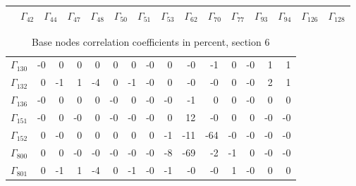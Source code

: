 {\begin{table}
\begin{center}
\begin{minipage}{\linewidth}
\begin{center}
\begin{envsmall}
\begin{center}
\begin{tabular}{rrrrrrrrrrrrrrr}
 & \( \Gamma_{42} \) & \( \Gamma_{44} \) & \( \Gamma_{47} \) & \( \Gamma_{48} \) & \( \Gamma_{50} \) & \( \Gamma_{51} \) & \( \Gamma_{53} \) & \( \Gamma_{62} \) & \( \Gamma_{70} \) & \( \Gamma_{77} \) & \( \Gamma_{93} \) & \( \Gamma_{94} \) & \( \Gamma_{126} \) & \( \Gamma_{128} \)
\\\hline
\end{tabular}
\end{center}
\end{envsmall}
\ifhevea\else
\end{center}
\end{minipage}
\fi
\end{center}
\ifhevea\end{table}\fi
\ifhevea\begin{table}\fi%
\begin{center}
\ifhevea
\caption{Base nodes correlation coefficients in percent, section 6\label{tab:tau:br-fit-corr6}}%
\else
\begin{minipage}{\linewidth}
\begin{center}
\label{tab:tau:br-fit-corr6}%
\fi
\begin{envsmall}
\begin{center}
\renewcommand*{\arraystretch}{1.1}%
\begin{tabular}{rrrrrrrrrrrrrrr}
\hline
\( \Gamma_{130} \) &   -0 &    0 &    0 &    0 &    0 &    0 &   -0 &    0 &   -0 &   -1 &    0 &   -0 &    1 &    1 \\
\( \Gamma_{132} \) &    0 &   -1 &    1 &   -4 &    0 &   -1 &   -0 &    0 &   -0 &   -0 &    0 &   -0 &    2 &    1 \\
\( \Gamma_{136} \) &   -0 &    0 &    0 &    0 &   -0 &    0 &   -0 &   -0 &   -1 &    0 &    0 &   -0 &    0 &    0 \\
\( \Gamma_{151} \) &   -0 &    0 &   -0 &    0 &   -0 &   -0 &   -0 &    0 &   12 &   -0 &    0 &    0 &   -0 &   -0 \\
\( \Gamma_{152} \) &    0 &   -0 &    0 &    0 &    0 &    0 &    0 &   -1 &  -11 &  -64 &   -0 &   -0 &   -0 &   -0 \\
\( \Gamma_{800} \) &    0 &    0 &   -0 &   -0 &   -0 &   -0 &   -0 &   -8 &  -69 &   -2 &   -1 &    0 &   -0 &   -0 \\
\( \Gamma_{801} \) &    0 &   -1 &    1 &   -4 &    0 &   -1 &   -0 &   -1 &   -0 &   -0 &    1 &   -0 &    0 &    0 \\

\end{tabular}
\end{center}
\end{envsmall}
\end{center}
\end{minipage}
\end{center}
\end{table}}
